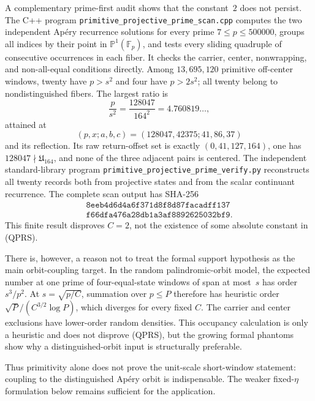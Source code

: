 \begin{remark}
A complementary prime-first audit shows that the constant~$2$ does not
persist.  The C++ program
\texttt{primitive\_projective\_prime\_scan.cpp} computes the two independent
Ap\'ery recurrence solutions for every prime $7\le p\le500000$, groups all
indices by their point in $\mathbb P^1(\mathbb F_p)$, and tests every sliding
quadruple of consecutive occurrences in each fiber.  It checks the carrier,
center, nonwrapping, and non-all-equal conditions directly.  Among
$13{,}695{,}120$ primitive off-center windows, twenty have $p>s^2$ and four
have $p>2s^2$; all twenty belong to nondistinguished fibers.  The largest
ratio is
\[
 \frac{p}{s^2}=\frac{128047}{164^2}=4.760819\ldots,
\]
attained at
\[
 (p,x;a,b,c)=(128047,42375;41,86,37)
\]
and its reflection.  Its raw return-offset set is exactly
$(0,41,127,164)$, one has $128047\nmid\mathfrak U_{164}$, and none of the
three adjacent pairs is centered.  The independent standard-library program
\texttt{primitive\_projective\_prime\_verify.py} reconstructs all twenty
records both from projective states and from the scalar continuant recurrence.
The complete scan output has SHA-256
\[
 \begin{gathered}
  \texttt{8eeb4d6d4a6f371d8f8d87facadff137}\\
  \texttt{f66dfa476a28db1a3af8892625032bf9}.
 \end{gathered}
\]
This finite result disproves $C=2$, not the existence of some absolute
constant in \textup{(QPRS)}.

There is, however, a reason not to treat the formal support hypothesis as the
main orbit-coupling target.  In the random palindromic-orbit model, the
expected number at one prime of four-equal-state windows of span at most~$s$
has order $s^3/p^2$.  At $s=\sqrt{p/C}$, summation over $p\le P$ therefore
has heuristic order $\sqrt P/(C^{3/2}\log P)$, which diverges for every fixed
$C$.  The carrier and center exclusions have lower-order random densities.
This occupancy calculation is only a heuristic and does not disprove
\textup{(QPRS)}, but the growing formal phantoms show why a distinguished-orbit
input is structurally preferable.

Thus primitivity alone does not prove the unit-scale short-window statement:
coupling to the distinguished Ap\'ery orbit is indispensable.  The weaker
fixed-$\eta$ formulation below remains sufficient for the application.


\end{remark}
